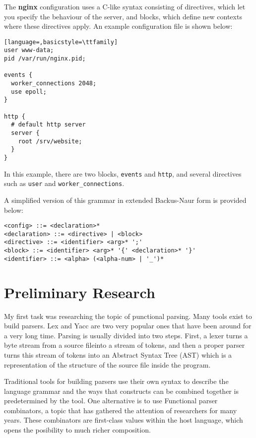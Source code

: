 \documentclass[]{article}
\begin{document}
The \textbf{nginx} configuration uses a C-like syntax consisting of
directives, which let you specify the behaviour of the server, and
blocks, which define new contexts where these directives apply. An
example configuration file is shown below:

\begin{lstlisting}[language=,basicstyle=\ttfamily]
user www-data;
pid /var/run/nginx.pid;

events {
  worker_connections 2048;
  use epoll;
}

http {
  # default http server
  server {
    root /srv/website;
  }
}
\end{lstlisting}

In this example, there are two blocks, \texttt{events} and
\texttt{http}, and several directives such as \texttt{user} and
\texttt{worker\_connections}.

A simplified version of this grammar in extended Backus-Naur form is
provided below:

\begin{verbatim}
<config> ::= <declaration>*
<declaration> ::= <directive> | <block>
<directive> ::= <identifier> <arg>* ';'
<block> ::= <identifier> <arg>* '{' <declaration>* '}'
<identifier> ::= <alpha> (<alpha-num> | '_')*
\end{verbatim}

\section{Preliminary Research}\label{preliminary-research}

My first task was researching the topic of punctional parsing.
Many tools exist to build parsers. Lex and Yacc are two very popular
ones that have been around for a very long time. Parsing is usually
divided into two steps. First, a lexer turns a byte stream from a source fileinto a
stream of tokens, and then a proper parser turns this stream of tokens
into an Abstract Syntax Tree (AST) which is a representation of the
structure of the source file inside the program.

Traditional tools for building parsers use their own syntax to describe
the language grammar and the ways that constructs can be combined together
is predetermined by the tool. One alternative is to use Functional parser
combinators, a topic that has gathered the attention of researchers for
many years. These combinators are first-class values within the host language,
which opens the posibility to much richer composition.
\end{document}
